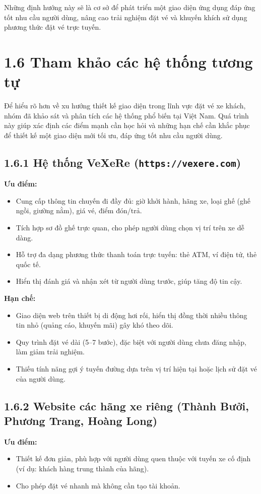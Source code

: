Những định hướng này sẽ là cơ sở để phát triển một giao diện ứng dụng đáp ứng tốt nhu cầu người dùng, nâng cao trải nghiệm đặt vé và khuyến khích sử dụng phương thức đặt vé trực tuyến.



\section*{1.6 Tham khảo các hệ thống tương tự}
Để hiểu rõ hơn về xu hướng thiết kế giao diện trong lĩnh vực đặt vé xe khách, nhóm đã khảo sát và phân tích các hệ thống phổ biến tại Việt Nam. Quá trình này giúp xác định các điểm mạnh cần học hỏi và những hạn chế cần khắc phục để thiết kế một giao diện mới tối ưu, đáp ứng tốt nhu cầu người dùng.

\subsection*{1.6.1 Hệ thống VeXeRe (\texttt{https://vexere.com})}
\textbf{Ưu điểm:}
\begin{itemize}
    \item Cung cấp thông tin chuyến đi đầy đủ: giờ khởi hành, hãng xe, loại ghế (ghế ngồi, giường nằm), giá vé, điểm đón/trả.
    \item Tích hợp sơ đồ ghế trực quan, cho phép người dùng chọn vị trí trên xe dễ dàng.
    \item Hỗ trợ đa dạng phương thức thanh toán trực tuyến: thẻ ATM, ví điện tử, thẻ quốc tế.
    \item Hiển thị đánh giá và nhận xét từ người dùng trước, giúp tăng độ tin cậy.
\end{itemize}

\textbf{Hạn chế:}
\begin{itemize}
    \item Giao diện web trên thiết bị di động hơi rối, hiển thị đồng thời nhiều thông tin nhỏ (quảng cáo, khuyến mãi) gây khó theo dõi.
    \item Quy trình đặt vé dài (5--7 bước), đặc biệt với người dùng chưa đăng nhập, làm giảm trải nghiệm.
    \item Thiếu tính năng gợi ý tuyến đường dựa trên vị trí hiện tại hoặc lịch sử đặt vé của người dùng.
\end{itemize}

\subsection*{1.6.2 Website các hãng xe riêng (Thành Bưởi, Phương Trang, Hoàng Long)}
\textbf{Ưu điểm:}
\begin{itemize}
    \item Thiết kế đơn giản, phù hợp với người dùng quen thuộc với tuyến xe cố định (ví dụ: khách hàng trung thành của hãng).
    \item Cho phép đặt vé nhanh mà không cần tạo tài khoản.
\end{itemize}

